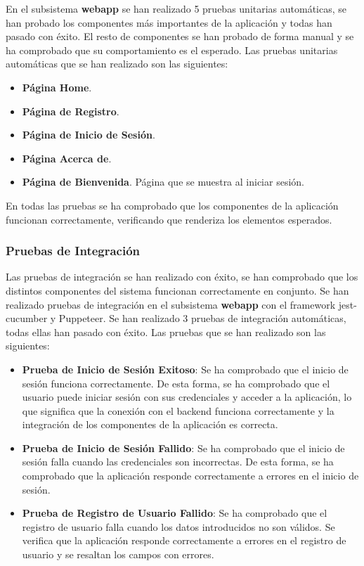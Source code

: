 En el subsistema \textbf{webapp} se han realizado 5 pruebas unitarias automáticas, se han probado los componentes más importantes de la aplicación y todas han pasado con éxito.
El resto de componentes se han probado de forma manual y se ha comprobado que su comportamiento es el esperado.
Las pruebas unitarias automáticas que se han realizado son las siguientes:
\begin{itemize}
    \item \textbf{Página Home}.
    \item \textbf{Página de Registro}.
    \item \textbf{Página de Inicio de Sesión}.
    \item \textbf{Página Acerca de}.
    \item \textbf{Página de Bienvenida}. Página que se muestra al iniciar sesión.
\end{itemize}
En todas las pruebas se ha comprobado que los componentes de la aplicación funcionan correctamente, verificando que renderiza los elementos esperados.

\subsubsection{Pruebas de Integración}
Las pruebas de integración se han realizado con éxito, se han comprobado que los distintos componentes del sistema funcionan correctamente en conjunto.
Se han realizado pruebas de integración en el subsistema \textbf{webapp} con el framework jest-cucumber y Puppeteer.
Se han realizado 3 pruebas de integración automáticas, todas ellas han pasado con éxito.
Las pruebas que se han realizado son las siguientes:
\begin{itemize}
    \item \textbf{Prueba de Inicio de Sesión Exitoso}: Se ha comprobado que el inicio de sesión funciona correctamente. De esta forma, se ha comprobado que el usuario puede iniciar sesión con sus credenciales y acceder a la aplicación, 
    lo que significa que la conexión con el backend funciona correctamente y la integración de los componentes de la aplicación es correcta.
    \item \textbf{Prueba de Inicio de Sesión Fallido}: Se ha comprobado que el inicio de sesión falla cuando las credenciales son incorrectas. De esta forma, se ha comprobado que la aplicación responde correctamente a errores en el inicio de sesión.
     \item \textbf{Prueba de Registro de Usuario Fallido}: Se ha comprobado que el registro de usuario falla cuando los datos introducidos no son válidos. 
     Se verifica que la aplicación responde correctamente a errores en el registro de usuario y se resaltan los campos con errores.
\end{itemize}

